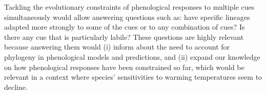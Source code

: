 \documentclass{article}\usepackage[]{graphicx}\usepackage[]{color}
\begin{document}
Tackling the evolutionary constraints of phenological responses to multiple cues simultaneously would allow answering questions such as: have specific lineages adapted more strongly to some of the cues or to any combination of cues? Is there any cue that is particularly labile? These questions are highly relevant because answering them would (i) inform about the need to account for phylogeny in phenological models and predictions, and (ii) expand our knowledge on how phenological responses have been constrained so far, which would be relevant in a context where species' sensitivities to warming temperatures seem to decline.\\ %
\end{document}
